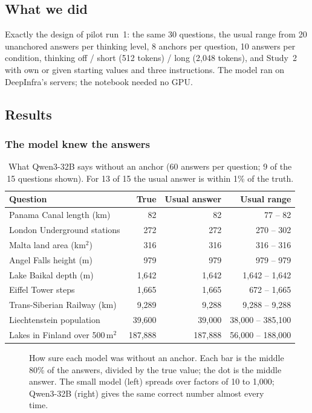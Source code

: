\documentclass[11pt,a4paper]{article}
\begin{document}
\subsection{What we did}
Exactly the design of pilot run~1: the same 30 questions, the usual range from 20 unanchored answers per thinking level, 8 anchors per question, 10 answers per condition, thinking off / short (512 tokens) / long (2,048 tokens), and Study~2 with own or given starting values and three instructions. The model ran on DeepInfra's servers; the notebook needed no GPU.

\subsection{Results}

\subsubsection{The model knew the answers}

\begin{table}[ht]
\centering\small
\begin{tabular}{@{}lrrr@{}}
\toprule
Question & True & Usual answer & Usual range \\
\midrule
Panama Canal length (km) & 82 & 82 & 77 -- 82 \\
London Underground stations & 272 & 272 & 270 -- 302 \\
Malta land area (km$^2$) & 316 & 316 & 316 -- 316 \\
Angel Falls height (m) & 979 & 979 & 979 -- 979 \\
Lake Baikal depth (m) & 1,642 & 1,642 & 1,642 -- 1,642 \\
Eiffel Tower steps & 1,665 & 1,665 & 672 -- 1,665 \\
Trans-Siberian Railway (km) & 9,289 & 9,288 & 9,288 -- 9,288 \\
Liechtenstein population & 39,600 & 39,000 & 38,000 -- 385,100 \\
Lakes in Finland over 500\,m$^2$ & 187,888 & 187,888 & 56,000 -- 188,000 \\
\bottomrule
\end{tabular}
\caption{What Qwen3-32B says without an anchor (60 answers per question; 9 of the 15 questions shown). For 13 of 15 the usual answer is within 1\% of the truth.}
\label{e2:tab:knowledge}
\end{table}

\begin{figure}[ht]
\centering{}
\caption{How sure each model was without an anchor. Each bar is the middle 80\% of the answers, divided by the true value; the dot is the middle answer. The small model (left) spreads over factors of 10 to 1,000; Qwen3-32B (right) gives the same correct number almost every time.}
\label{e2:fig:sure}
\end{figure}
\end{document}
